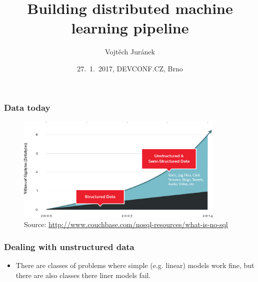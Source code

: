 \documentclass[10pt,utf8]{beamer}
\title{Building distributed machine learning pipeline}
\author{Vojtěch Juránek}
\institute[Red Hat]{JBoss - a division by Red Hat}
\date{27.~1.~2017, DEVCONF.CZ, Brno}
\begin{document}
	
\begin{frame}
 \titlepage
\end{frame}
	
\begin{frame}
	\frametitle{Data today}
	\begin{figure}
		\centering
		\includegraphics[width=10cm]{./img/why-nosql-2.eps}
		\caption{\tiny{Source: \url{http://www.couchbase.com/nosql-resources/what-is-no-sql}}}
	\end{figure}
\end{frame}

\begin{frame}
	\frametitle{Dealing with unstructured data}
	\begin{itemize}
		\item There are classes of problems where simple (e.g. linear) models work fine, but there are also classes there liner models fail.
	\end{itemize}
\end{frame}
\end{document}
